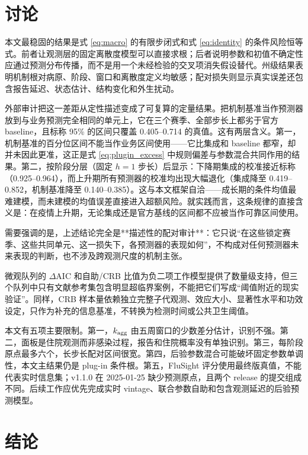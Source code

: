 \documentclass[11pt,a4paper]{article}
\begin{document}
\section{讨论}

本文最稳固的结果是式 \eqref{eq:macro} 的有限步闭式和式 \eqref{eq:identity} 的条件风险恒等式。前者让观测层的固定离散度模型可以直接求根；后者说明参数和初值不确定性应通过预测分布传播，而不是用一个未经检验的交叉项消失假设替代。州级结果表明机制根对病原、阶段、窗口和离散度定义均敏感；配对损失则显示真实误差还包含报告延迟、状态估计、结构变化和外生扰动。

外部审计把这一差距从定性描述变成了可复算的定量结果。把机制基准当作预测器放到与业务预测完全相同的单元上，它在三个赛季、全部步长上都劣于官方 baseline，且标称 95\% 的区间只覆盖 0.405--0.714 的真值。这有两层含义。第一，机制基准的百分位区间不能当作业务区间使用——它比集成和 baseline 都窄，却并未因此更准，这正是式 \eqref{eq:plugin_excess} 中规则偏差与参数混合共同作用的结果。第二，按阶段分层（固定 $h=1$ 步长）后显示：下降期集成的校准接近标称（0.925--0.964），而上升期所有预测器的校准均出现大幅退化（集成降至 0.419--0.852，机制基准降至 0.140--0.385）。这与本文框架自洽——成长期的条件均值最难建模，而未建模的均值误差直接进入超额风险。就实践而言，这条规律的直接含义是：在疫情上升期，无论集成还是官方基线的区间都不应被当作可靠区间使用。

需要强调的是，上述结论完全是**描述性的配对审计**：它只说“在这些锁定赛季、这些共同单元、这一损失下，各预测器的表现如何”，不构成对任何预测器未来表现的判断，也不涉及跨观测尺度的机制主张。

微观队列的 $\Delta$AIC 和自助/CRB 比值为负二项工作模型提供了数量级支持，但三个队列中只有文献参考集包含明显超临界案例，不能把它们写成“阈值附近的现实验证”。同样，CRB 样本量依赖独立完整子代观测、效应大小、显著性水平和功效设定，只作为补充的信息基准，不转换为检测时间或公共卫生阈值。

本文有五项主要限制。第一，$k_{\rm agg}$ 由五周窗口的少数差分估计，识别不强。第二，面板是住院观测而非感染过程，报告和住院概率没有单独识别。第三，每阶段原点最多六个，长步长配对区间很宽。第四，后验参数混合可能破坏固定参数单调性，本文主结果仍是 plug-in 条件根。第五，FluSight 评分使用最终版真值，不能代表实时信息集；v1.1.0 在 2025-01-25 缺少预测原点，且两个 release 的提交组成不同。后续工作应优先完成实时 vintage、联合参数自助和包含观测延迟的后验预测模型。

\section{结论}
\end{document}
